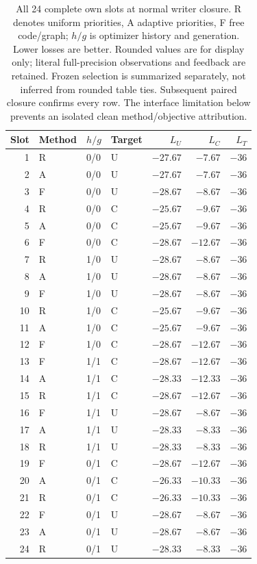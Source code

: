 \begin{table}[t]
\centering\small
\setlength{\tabcolsep}{5pt}
\begin{tabular}{rlllrrr}
\toprule
Slot & Method & $h/g$ & Target & $L_U$ & $L_C$ & $L_T$\\
\midrule
1 & R & 0/0 & U & $-27.67$ & $-7.67$ & $-36$\\
2 & A & 0/0 & U & $-27.67$ & $-7.67$ & $-36$\\
3 & F & 0/0 & U & $-28.67$ & $-8.67$ & $-36$\\
4 & R & 0/0 & C & $-25.67$ & $-9.67$ & $-36$\\
5 & A & 0/0 & C & $-25.67$ & $-9.67$ & $-36$\\
6 & F & 0/0 & C & $-28.67$ & $-12.67$ & $-36$\\
7 & R & 1/0 & U & $-28.67$ & $-8.67$ & $-36$\\
8 & A & 1/0 & U & $-28.67$ & $-8.67$ & $-36$\\
9 & F & 1/0 & U & $-28.67$ & $-8.67$ & $-36$\\
10 & R & 1/0 & C & $-25.67$ & $-9.67$ & $-36$\\
11 & A & 1/0 & C & $-25.67$ & $-9.67$ & $-36$\\
12 & F & 1/0 & C & $-28.67$ & $-12.67$ & $-36$\\
13 & F & 1/1 & C & $-28.67$ & $-12.67$ & $-36$\\
14 & A & 1/1 & C & $-28.33$ & $-12.33$ & $-36$\\
15 & R & 1/1 & C & $-28.67$ & $-12.67$ & $-36$\\
16 & F & 1/1 & U & $-28.67$ & $-8.67$ & $-36$\\
17 & A & 1/1 & U & $-28.33$ & $-8.33$ & $-36$\\
18 & R & 1/1 & U & $-28.33$ & $-8.33$ & $-36$\\
19 & F & 0/1 & C & $-28.67$ & $-12.67$ & $-36$\\
20 & A & 0/1 & C & $-26.33$ & $-10.33$ & $-36$\\
21 & R & 0/1 & C & $-26.33$ & $-10.33$ & $-36$\\
22 & F & 0/1 & U & $-28.67$ & $-8.67$ & $-36$\\
23 & A & 0/1 & U & $-28.67$ & $-8.67$ & $-36$\\
24 & R & 0/1 & U & $-28.33$ & $-8.33$ & $-36$\\
\bottomrule
\end{tabular}
\caption{All 24 complete own slots at normal writer closure. R denotes uniform
priorities, A adaptive priorities, F free code/graph; $h/g$ is optimizer history
and generation. Lower losses are better. Rounded values are for display only;
literal full-precision observations and feedback are retained. Frozen selection
is summarized separately, not inferred from rounded table ties. Subsequent paired
closure confirms every row. The interface limitation below prevents an
isolated clean method/objective attribution.}
\label{tab:native-priority-prefix}
\end{table}

